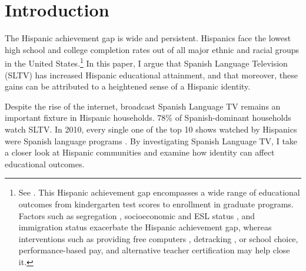 \documentclass[11pt]{article}
\begin{document}
\thispagestyle{empty}

\newpage 
\renewcommand{\thefootnote}{\arabic{footnote}}

\pagebreak 
\setcounter{page}{0}


\onehalfspacing


\newpage

\setcounter{page}{1}
\section{Introduction}


The Hispanic achievement gap is wide and persistent. Hispanics face the lowest high school and college completion rates out of all major ethnic and racial groups in the United States.\footnote{ See \cite{tienda_hispanicity_2009}. This Hispanic achievement gap encompasses a wide range of educational outcomes from kindergarten test scores to enrollment in graduate programs. Factors such as segregation \citep{cascio_cracks_2012}, socioeconomic and ESL status \citep{carpenter2006gap}, and immigration status \citep{reardon2009hispanic} exacerbate the Hispanic achievement gap, whereas interventions such as providing free computers \citep{fairlie2012academic}, detracking \citep{burris2005closing}, or school choice, performance-based pay, and alternative teacher certification \citep{ladner2010closing} may help close it.   } In this paper, I argue that Spanish Language Television (SLTV) has increased Hispanic educational attainment, and that moreover, these gains can be attributed to a heightened sense of a Hispanic identity.

Despite the rise of the internet, broadcast Spanish Language TV remains an important fixture in Hispanic households. 78\% of Spanish-dominant households watch SLTV. In 2010, every single one of the top 10 shows watched by Hispanics were Spanish language programs \citep{pardo_three_2011}. By investigating Spanish Language TV, I take a closer look at Hispanic communities and examine how identity can affect educational outcomes. %
\end{document}
